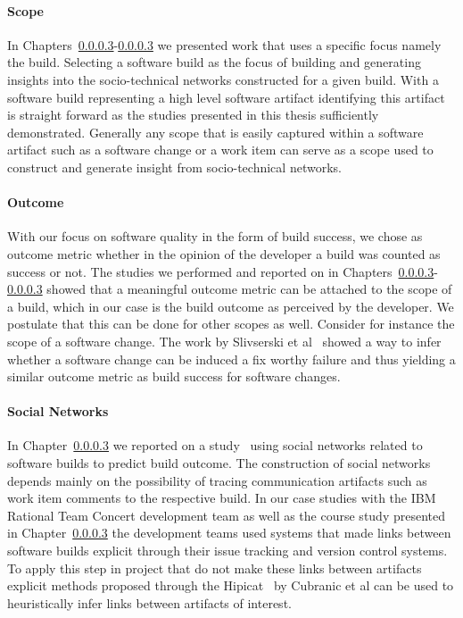 \paragraph{Scope}
In Chapters~\ref{}-\ref{} we presented work that uses a specific focus namely the build.
Selecting a software build as the focus of building and generating insights into the socio-technical networks constructed for a given build.
With a software build representing a high level software artifact identifying this artifact is straight forward as the studies presented in this thesis sufficiently demonstrated.
Generally any scope that is easily captured within a software artifact such as a software change or a work item can serve as a scope used to construct and generate insight from socio-technical networks.

\paragraph{Outcome}
With our focus on software quality in the form of build success, we chose as outcome metric whether in the opinion of the developer a build was counted as success or not.
The studies we performed and reported on in Chapters~\ref{}-\ref{} showed that a meaningful outcome metric can be attached to the scope of a build, which in our case is the build outcome as perceived by the developer.
We postulate that this can be done for other scopes as well.
Consider for instance the scope of a software change.
The work by Slivserski et al~\cite{sliwerski:notes} showed a way to infer whether a software change can be induced a fix worthy failure and thus yielding a similar outcome metric as build success for software changes. 

\paragraph{Social Networks}
In Chapter~\ref{} we reported on a study~\cite{wolf:icse:2009} using social networks related to software builds to predict build outcome.
The construction of social networks depends mainly on the possibility of tracing communication artifacts such as work item comments to the respective build.
In our case studies with the IBM Rational Team Concert development team as well as the course study presented in Chapter~\ref{} the development teams used systems that made links between software builds explicit through their issue tracking and version control systems.
To apply this step in project that do not make these links between artifacts explicit methods proposed through the Hipicat~\cite{cubranic:tse:2005} by Cubranic et al can be used to heuristically infer links between artifacts of interest.

